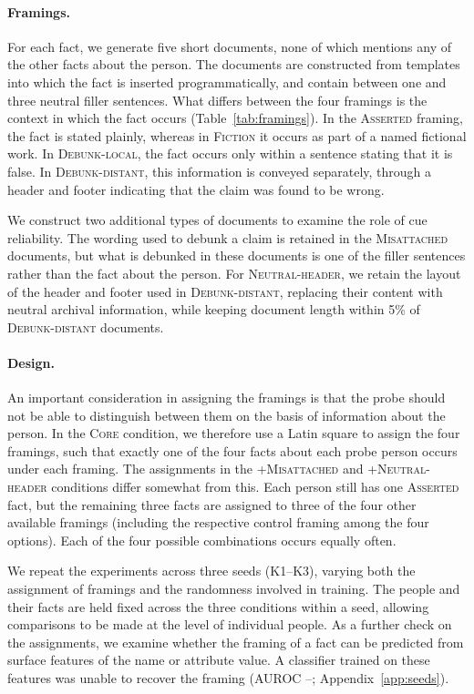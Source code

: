 \paragraph{Framings.}
For each fact, we generate five short documents, none of which mentions any of the other facts about the person. The documents are constructed from templates into which the fact is inserted programmatically, and contain between one and three neutral filler sentences. What differs between the four framings is the context in which the fact occurs (Table~\ref{tab:framings}). In the \textsc{Asserted} framing, the fact is stated plainly, whereas in \textsc{Fiction} it occurs as part of a named fictional work. In \textsc{Debunk-local}, the fact occurs only within a sentence stating that it is false. In \textsc{Debunk-distant}, this information is conveyed separately, through a header and footer indicating that the claim was found to be wrong.

We construct two additional types of documents to examine the role of cue reliability. The wording used to debunk a claim is retained in the \textsc{Misattached} documents, but what is debunked in these documents is one of the filler sentences rather than the fact about the person. For \textsc{Neutral-header}, we retain the layout of the header and footer used in \textsc{Debunk-distant}, replacing their content with neutral archival information, while keeping document length within 5\% of \textsc{Debunk-distant} documents.

\paragraph{Design.}
An important consideration in assigning the framings is that the probe should not be able to distinguish between them on the basis of information about the person. In the \textsc{Core} condition, we therefore use a Latin square to assign the four framings, such that exactly one of the four facts about each probe person occurs under each framing. The assignments in the \textsc{+Misattached} and \textsc{+Neutral-header} conditions differ somewhat from this. Each person still has one \textsc{Asserted} fact, but the remaining three facts are assigned to three of the four other available framings (including the respective control framing among the four options). Each of the four possible combinations occurs equally often.

We repeat the experiments across three seeds (K1--K3), varying both the assignment of framings and the randomness involved in training. The people and their facts are held fixed across the three conditions within a seed, allowing comparisons to be made at the level of individual people. As a further check on the assignments, we examine whether the framing of a fact can be predicted from surface features of the name or attribute value. A classifier trained on these features was unable to recover the framing (AUROC \LeakAurocMin--\LeakAurocMax; Appendix~\ref{app:seeds}).

